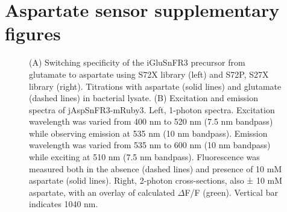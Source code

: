 \chapter{Aspartate sensor supplementary figures}

\begin{figure}[ht]
    \centering
    \caption[Aspartate specificity and excitation/emission spectra.]{
    (A) Switching specificity of the iGluSnFR3 precursor from glutamate to aspartate using S72X library (left) and S72P, S27X library (right).
    Titrations with aspartate (solid lines) and glutamate (dashed lines) in bacterial lysate.
    (B) Excitation and emission spectra of jAspSnFR3-mRuby3.
    Left, 1-photon spectra.
    Excitation wavelength was varied from 400 nm to 520 nm (7.5 nm bandpass) while observing emission at 535 nm (10 nm bandpass).
    Emission wavelength was varied from 535 nm to 600 nm (10 nm bandpass) while exciting at 510 nm (7.5 nm bandpass).
    Fluorescence was measured both in the absence (dashed lines) and presence of 10 mM aspartate (solid lines).
    Right, 2-photon cross-sections, also ± 10 mM aspartate, with an overlay of calculated $\Delta$F/F (green).
    Vertical bar indicates 1040 nm.
    }
    \label{ch3:figsupp:f1S1}
\end{figure}

